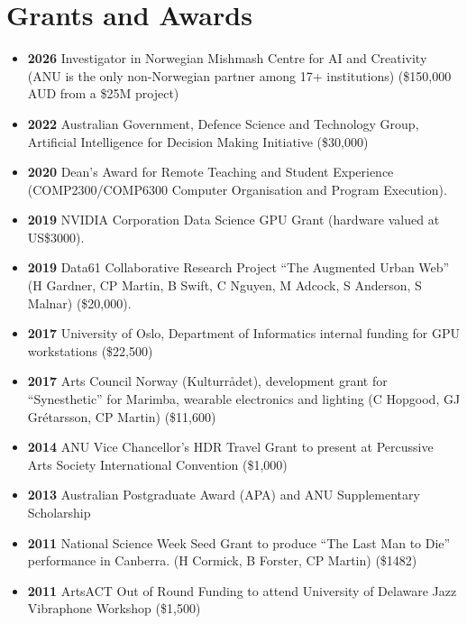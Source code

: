 \documentclass[11pt, a4paper, oneside]{article}
\begin{document}
\pagebreak
\section{Grants and Awards}
\label{grantsandawards}

\begin{itemize}

\item \textbf{2026} Investigator in Norwegian Mishmash Centre for AI and Creativity (ANU is the only non-Norwegian partner among 17+ institutions) (\$150,000 AUD from a \$25M project)

\item \textbf{2022} Australian Government, Defence Science and Technology Group, Artificial Intelligence for Decision Making Initiative (\$30,000)

\item \textbf{2020} Dean's Award for Remote Teaching and Student Experience (COMP2300/COMP6300 Computer Organisation and Program Execution).
  
\item \textbf{2019} NVIDIA Corporation Data Science GPU Grant (hardware valued at US\$3000).

\item \textbf{2019} Data61 Collaborative Research Project ``The Augmented Urban Web''  (H Gardner, CP Martin, B Swift, C Nguyen, M Adcock, S Anderson, S Malnar) (\$20,000).

\item \textbf{2017} University of Oslo, Department of Informatics internal funding for GPU workstations (\$22,500)
  
\item \textbf{2017} Arts Council Norway (Kulturrådet), development grant for ``Synesthetic'' for Marimba, wearable electronics and lighting (C Hopgood, GJ Grétarsson, CP Martin) (\$11,600)

\item \textbf{2014} ANU Vice Chancellor's HDR Travel Grant to present at Percussive Arts Society International Convention (\$1,000)

\item \textbf{2013} Australian Postgraduate Award (APA) and ANU Supplementary Scholarship 

\item \textbf{2011} National Science Week Seed Grant to produce ``The Last Man to Die'' performance in Canberra. (H Cormick, B Forster, CP Martin) (\$1482)

\item \textbf{2011} ArtsACT Out of Round Funding to attend University of Delaware Jazz Vibraphone Workshop (\$1,500)


\end{itemize}
\end{document}
